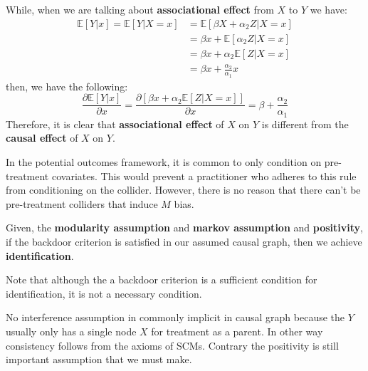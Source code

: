 While, when we are talking about \textbf{associational effect} from $X$ to $Y$ we have:
\begin{equation}
    \begin{array}{ll}
        \mathbb{E}[Y | x] = \mathbb{E}[Y | X = x] & = \mathbb{E}[\beta X + \alpha_2 Z | X = x] \\
                                                  & = \beta x + \mathbb{E}[\alpha_2 Z |X = x]  \\
                                                  & = \beta x + \alpha_2 \mathbb{E}[Z |X = x]  \\
                                                  & = \beta x + \frac{\alpha_2}{\alpha_1} x
    \end{array}
\end{equation}
then, we have the following:
\begin{equation}
    \frac{\partial \mathbb{E}[Y |x]}{\partial x} = \frac{\partial[\beta x + \alpha_2 \mathbb{E}[Z |X = x]]}{\partial x} = \beta + \frac{\alpha_2}{\alpha_1}
\end{equation}
Therefore, it is clear that \textbf{associational effect} of  $X$ on $Y$ is
different from the \textbf{causal effect} of $X$ on $Y$.

In the potential outcomes framework, it is common to only condition on pre-treatment
covariates. This would prevent a practitioner who adheres to this rule from
conditioning on the collider. However, there is no reason that there can't be
pre-treatment colliders that induce $M$ bias.

Given, the \textbf{modularity assumption} and \textbf{markov assumption} and
\textbf{positivity}, if the backdoor criterion is satisfied in our assumed causal
graph, then we achieve \textbf{identification}.

\begin{note}
    Note that although the a backdoor criterion is a sufficient condition for
    identification, it is not a necessary condition.
\end{note}
\begin{note}
    No interference assumption in commonly implicit in causal graph because the $Y$
    usually only has a single node $X$ for treatment as a parent. In other way
    consistency follows from the axioms of SCMs. Contrary the positivity is still
    important assumption that we must make.
\end{note}

